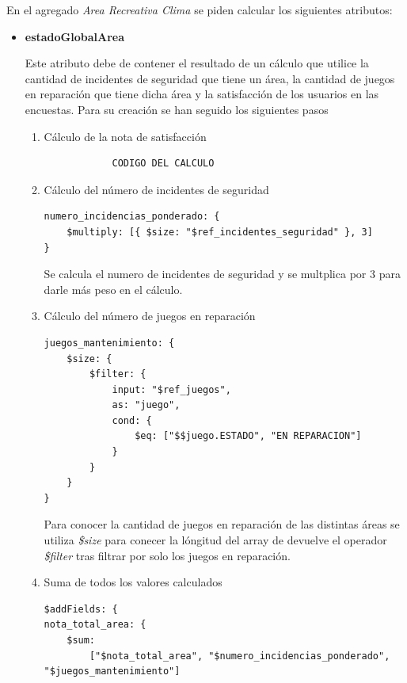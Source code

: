 \documentclass[]{article}
\begin{document}
En el agregado \textit{Area Recreativa Clima} se piden calcular los siguientes atributos:
\begin{itemize}
    \item \textbf{estadoGlobalArea}
    
    Este atributo debe de contener el resultado de un cálculo que utilice la cantidad de incidentes de seguridad que tiene un área, la cantidad de juegos en reparación que tiene dicha área y la satisfacción de los usuarios en las encuestas. Para su creación se han seguido los siguientes pasos
    \begin{enumerate}
        \item Cálculo de la nota de satisfacción
        
        \begin{lstlisting}
            CODIGO DEL CALCULO
        \end{lstlisting}

        \item Cálculo del número de incidentes de seguridad
        
        \begin{lstlisting}
numero_incidencias_ponderado: {
    $multiply: [{ $size: "$ref_incidentes_seguridad" }, 3]
}
        \end{lstlisting}

        Se calcula el numero de incidentes de seguridad y se multplica por 3 para darle más peso en el cálculo.

        \item Cálculo del número de juegos en reparación 
        
        \begin{lstlisting}
juegos_mantenimiento: {
    $size: {
        $filter: {
            input: "$ref_juegos",
            as: "juego",
            cond: {
                $eq: ["$$juego.ESTADO", "EN REPARACION"]
            }
        }
    }
}
        \end{lstlisting}

        Para conocer la cantidad de juegos en reparación de las distintas áreas se utiliza \textit{\$size} para conecer la lóngitud del array de devuelve el operador \textit{\$filter} tras filtrar por solo los juegos en reparación.

        \item Suma de todos los valores calculados
        
        \begin{lstlisting}
$addFields: {
nota_total_area: {
    $sum: 
        ["$nota_total_area", "$numero_incidencias_ponderado", "$juegos_mantenimiento"]
    

\end{lstlisting}
\end{enumerate}
\end{itemize}
\end{document}
